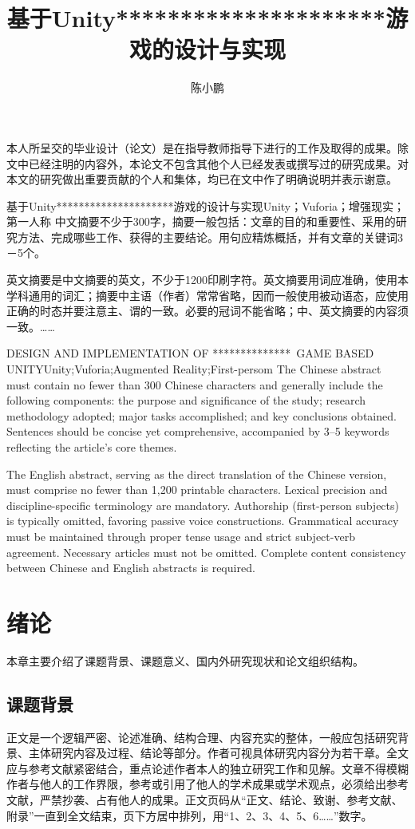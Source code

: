 \documentclass[12pt]{graduate-design-manual}
\title{基于Unity*********************游戏的设计与实现}
\author{陈\quad 小\quad 鹏}
\begin{document}
\makecover
\begin{originalitystatement}
本人所呈交的毕业设计（论文）是在指导教师指导下进行的工作及取得的成果。除文中已经注明的内容外，本论文不包含其他个人已经发表或撰写过的研究成果。对本文的研究做出重要贡献的个人和集体，均已在文中作了明确说明并表示谢意。
\end{originalitystatement}
\begin{cnabstract}{基于Unity*********************游戏的设计与实现}{Unity；Vuforia；增强现实；第一人称}
中文摘要不少于300字，摘要一般包括：文章的目的和重要性、采用的研究方法、完成哪些工作、获得的主要结论。用句应精炼概括，并有文章的关键词3－5个。

英文摘要是中文摘要的英文，不少于1200印刷字符。英文摘要用词应准确，使用本学科通用的词汇；摘要中主语（作者）常常省略，因而一般使用被动语态，应使用正确的时态并要注意主、谓的一致。必要的冠词不能省略；中、英文摘要的内容须一致。……
\end{cnabstract}
	
\begin{englishabstract}{DESIGN AND IMPLEMENTATION OF **************~GAME BASED UNITY}{Unity;Vuforia;Augmented Reality;First-persom}
The Chinese abstract must contain no fewer than 300 Chinese characters and generally include the following components: the purpose and significance of the study; research methodology adopted; major tasks accomplished; and key conclusions obtained. Sentences should be concise yet comprehensive, accompanied by 3–5 keywords reflecting the article's core themes. 

The English abstract, serving as the direct translation of the Chinese version, must comprise no fewer than 1,200 printable characters. Lexical precision and discipline-specific terminology are mandatory. Authorship (first-person subjects) is typically omitted, favoring passive voice constructions. Grammatical accuracy must be maintained through proper tense usage and strict subject-verb agreement. Necessary articles must not be omitted. Complete content consistency between Chinese and English abstracts is required.
\end{englishabstract}

\contents
{}
\mainbody
\section{绪论}
本章主要介绍了课题背景、课题意义、国内外研究现状和论文组织结构。

\subsection{课题背景}
正文是一个逻辑严密、论述准确、结构合理、内容充实的整体，一般应包括研究背景、主体研究内容及过程、结论等部分。作者可视具体研究内容分为若干章。全文应与参考文献紧密结合，重点论述作者本人的独立研究工作和见解。文章不得模糊作者与他人的工作界限，参考或引用了他人的学术成果或学术观点，必须给出参考文献，严禁抄袭、占有他人的成果。正文页码从“正文、结论、致谢、参考文献、附录”一直到全文结束，页下方居中排列，用“1、2、3、4、5、6……”数字。
\end{document}
